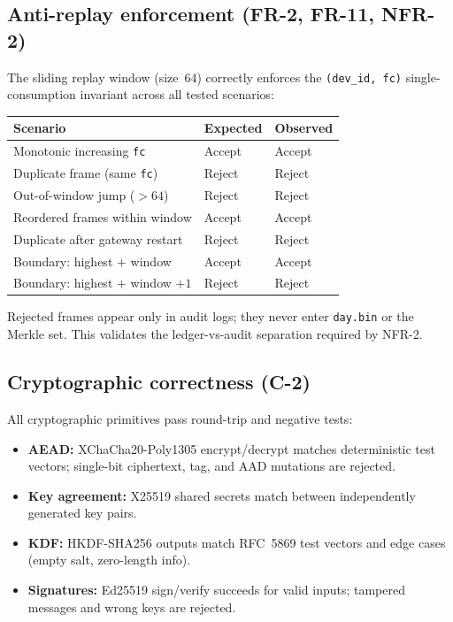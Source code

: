 \subsection{Anti-replay enforcement (FR-2, FR-11, NFR-2)}

The sliding replay window (size~64) correctly enforces the
\texttt{(dev\_id,~fc)} single-consumption invariant across all tested
scenarios:

\begin{center}
    \small
    \begin{tabular}{lll}
        \toprule
        \textbf{Scenario} & \textbf{Expected} & \textbf{Observed} \\
        \midrule
        Monotonic increasing \texttt{fc}           & Accept  & Accept  \\
        Duplicate frame (same \texttt{fc})         & Reject  & Reject  \\
        Out-of-window jump ($> 64$)                & Reject  & Reject  \\
        Reordered frames within window             & Accept  & Accept  \\
        Duplicate after gateway restart            & Reject  & Reject  \\
        Boundary: highest $+$ window              & Accept  & Accept  \\
        Boundary: highest $+$ window $+ 1$        & Reject  & Reject  \\
        \bottomrule
    \end{tabular}
\end{center}

Rejected frames appear only in audit logs; they never enter
\texttt{day.bin} or the Merkle set.
This validates the ledger-vs-audit
separation required by NFR-2.

\subsection{Cryptographic correctness (C-2)}

All cryptographic primitives pass round-trip and negative tests:

\begin{itemize}[nosep]
  \item \textbf{AEAD:} XChaCha20-Poly1305 encrypt/decrypt matches
  deterministic test vectors; single-bit ciphertext, tag, and
  \ac{AAD} mutations are rejected.
  \item \textbf{Key agreement:} X25519 shared secrets match between
  independently generated key pairs.
  \item \textbf{KDF:} \ac{HKDF}-\ac{SHA}256 outputs match \ac{RFC}~5869 test vectors
  and edge cases (empty salt, zero-length info).
  \item \textbf{Signatures:} Ed25519 sign/verify succeeds for valid
  inputs; tampered messages and wrong keys are rejected.
\end{itemize}

